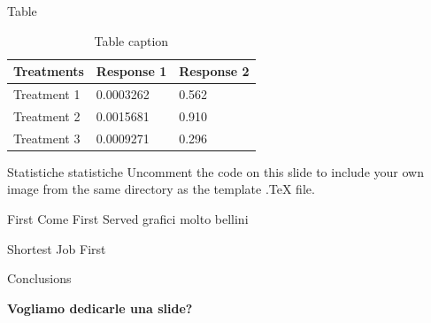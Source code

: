 \documentclass[aspectratio=169,xcolor=dvipsnames]{beamer}
\begin{document}

\begin{frame}{Table}
    \begin{table}
        \begin{tabular}{l l l}
            \toprule
            \textbf{Treatments} & \textbf{Response 1} & \textbf{Response 2} \\
            \midrule
            Treatment 1         & 0.0003262           & 0.562               \\
            Treatment 2         & 0.0015681           & 0.910               \\
            Treatment 3         & 0.0009271           & 0.296               \\
            \bottomrule
        \end{tabular}
        \caption{Table caption}
    \end{table}
\end{frame}


\begin{frame}{Statistiche statistiche}
    Uncomment the code on this slide to include your own image from the same directory as the template .TeX file.
\end{frame}


\begin{frame}{First Come First Served}
    grafici molto bellini
\end{frame}


\begin{frame}{Shortest Job First}
\end{frame}


\begin{frame}{Conclusions}
    \centerline{\textbf{Vogliamo dedicarle una slide?}}
\end{frame}

\end{document}

